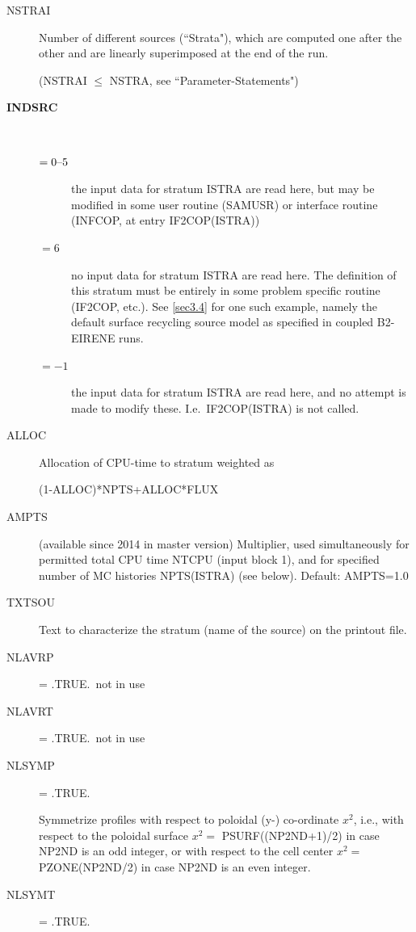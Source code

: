 \begin{description}
  \item[NSTRAI] Number of different sources (``Strata"),
        which are computed one after the other and are linearly superimposed at the end
        of the run.

        (NSTRAI $\le$ NSTRA, see ``Parameter-Statements")
  \item[\textbf{INDSRC}] ~

        \begin{description}
          \item[$= 0 \textup{--} 5$] the input data for stratum ISTRA
                are read here, but may be modified in some user routine (SAMUSR) or interface
                routine (INFCOP, at entry IF2COP(ISTRA))
          \item[$= 6$] no input data for stratum
                ISTRA are read here.
                The definition of this stratum must be entirely in some problem specific
                routine (IF2COP, etc.).
                See \cref{sec3.4} for one such example, namely the default surface recycling
                source model as specified in coupled B2-EIRENE runs.
          \item[$= -1$] the input data for stratum ISTRA are read here, and no attempt is
                made to modify these.
                I.e.\ IF2COP(ISTRA) is not called.
        \end{description}
  \item[ALLOC]	Allocation of CPU-time to stratum weighted as

        (1-ALLOC)*NPTS+ALLOC*FLUX
  \item[AMPTS]	(available since 2014 in master
        version) Multiplier, used simultaneously for permitted total CPU time NTCPU
        (input block 1), and for specified number of MC histories NPTS(ISTRA) (see
        below).
        Default: AMPTS=1.0
  \item[TXTSOU] Text to characterize the stratum (name of the
        source) on the printout file.
  \item[NLAVRP] = .TRUE.\ not in use
  \item[NLAVRT] = .TRUE.\ not in use
  \item[NLSYMP] = .TRUE.

        Symmetrize profiles with respect to poloidal (y-) co-ordinate $x^2$, i.e., with
        respect to the poloidal surface $x^2=$ PSURF((NP2ND+1)/2) in case NP2ND is an
        odd integer, or with respect to the cell center $x^2=$ PZONE(NP2ND/2) in case
        NP2ND is an even integer.
  \item[NLSYMT] = .TRUE.


\end{description}
